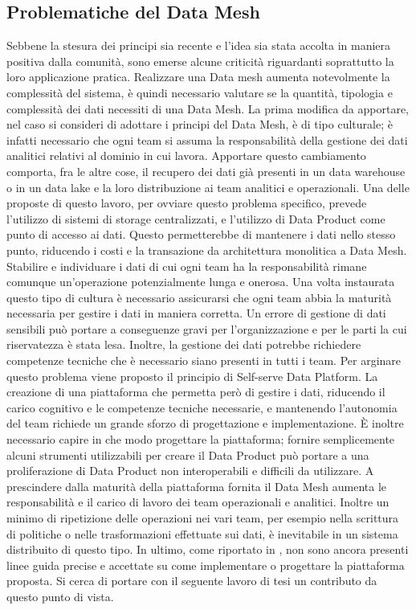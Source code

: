 \documentclass[a4paper,12pt]{report}
\begin{document}
\subsection{Problematiche del Data Mesh}
Sebbene la stesura dei principi sia recente e l'idea sia stata accolta in maniera positiva dalla comunità, sono emerse alcune criticità riguardanti soprattutto la loro applicazione pratica.
Realizzare una Data mesh aumenta notevolmente la complessità del sistema, è quindi necessario valutare se la quantità, tipologia e complessità dei dati necessiti di una Data Mesh.
La prima modifica da apportare, nel caso si consideri di adottare i principi del Data Mesh, è di tipo culturale; è infatti necessario che ogni team si assuma la responsabilità della gestione dei dati analitici relativi al dominio in cui lavora.
Apportare questo cambiamento comporta, fra le altre cose, il recupero dei dati già presenti in un data warehouse o in un data lake e la loro distribuzione ai team analitici e operazionali.
Una delle proposte di questo lavoro, per ovviare questo problema specifico, prevede l'utilizzo di sistemi di storage centralizzati, e l'utilizzo di Data Product come punto di accesso ai dati.
Questo permetterebbe di mantenere i dati nello stesso punto, riducendo i costi e la transazione da architettura monolitica a Data Mesh.
Stabilire e individuare i dati di cui ogni team ha la responsabilità rimane comunque un'operazione potenzialmente lunga e onerosa.
Una volta instaurata questo tipo di cultura è necessario assicurarsi che ogni team abbia la maturità necessaria per gestire i dati in maniera corretta.
Un errore di gestione di dati sensibili può portare a conseguenze gravi per l'organizzazione e per le parti la cui riservatezza è stata lesa.
Inoltre, la gestione dei dati potrebbe richiedere competenze tecniche che è necessario siano presenti in tutti i team.
Per arginare questo problema viene proposto il principio di Self-serve Data Platform.
La creazione di una piattaforma che permetta però di gestire i dati, riducendo il carico cognitivo e le competenze tecniche necessarie, e mantenendo l'autonomia del team richiede un grande sforzo di progettazione e implementazione.
È inoltre necessario capire in che modo progettare la piattaforma; fornire semplicemente alcuni strumenti utilizzabili per creare il Data Product può portare a una proliferazione di Data Product non interoperabili e difficili da utilizzare.
A prescindere dalla maturità della piattaforma fornita il Data Mesh aumenta le responsabilità e il carico di lavoro dei team operazionali e analitici.
Inoltre un minimo di ripetizione delle operazioni nei vari team, per esempio nella  scrittura di politiche o nelle trasformazioni effettuate sui dati, è inevitabile in un sistema distribuito di questo tipo.
In ultimo, come riportato in \cite{araujo2022advancing}, non sono ancora presenti linee guida precise e accettate su come implementare o progettare la piattaforma proposta.
Si cerca di portare con il seguente lavoro di tesi un contributo da questo punto di vista.
\end{document}
